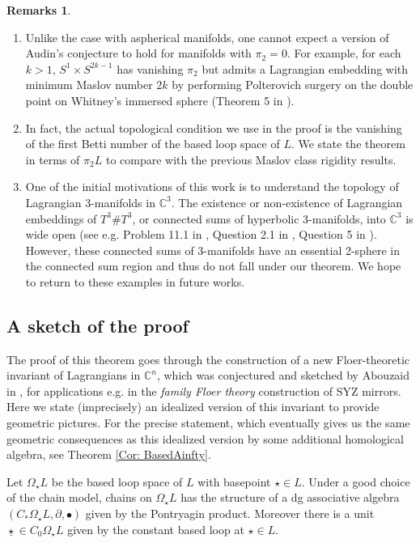\documentclass[10pt]{amsart}
\numberwithin{equation}{section}
\theoremstyle{plain}
\theoremstyle{definition}
\newtheorem{remarks}[theorem]{Remarks}
\theoremstyle{remark}
\numberwithin{equation}{section}
\newcommand{\C}{\mathbb{C}}
\begin{document}
\begin{remarks}
	\begin{enumerate}
		\item 	Unlike the case with aspherical manifolds, one cannot expect a version of Audin's conjecture to hold for manifolds with $\pi_2=0$. For example, for each $k>1$, $S^1\times S^{2k-1}$ has vanishing $\pi_2$ but admits a Lagrangian embedding with minimum Maslov number $2k$ by performing Polterovich surgery on the double point on Whitney's immersed sphere (Theorem 5 in \cite{PolterovichSurgery}).
		\item 	In fact, the actual topological condition we use in the proof is the vanishing of  the first Betti number of the based loop space of $L$.
		We state the theorem in terms of $\pi_2 L$ to compare with the previous Maslov class rigidity results.
		\item One of the initial motivations of this work is to understand the topology of Lagrangian 3-manifolds in $\C^3$. The existence or non-existence of Lagrangian embeddings of $T^3\# T^3$, or connected sums of hyperbolic 3-manifolds, into $\C^3$ is wide open (see e.g. Problem 11.1 in \cite{FukayaLagrangian}, Question 2.1 in \cite{SmithSurvey}, Question 5 in \cite{EvansKedra}). However, these connected sums of 3-manifolds have an essential 2-sphere in the connected sum region and thus do not fall under our theorem. We hope to return to these examples in future works.
	\end{enumerate}
\end{remarks}

\subsection{A sketch of the proof}

The proof of this theorem goes through the construction of a new Floer-theoretic invariant of Lagrangians in $\C^n$, which was conjectured and sketched by Abouzaid in \cite{AbouzaidLect}, for applications e.g. in the \emph{family Floer theory} construction of SYZ mirrors.
Here we state (imprecisely) an idealized version of this invariant to provide geometric pictures. 
For the precise statement, which eventually gives us the same geometric consequences as this idealized version by some additional homological algebra, see Theorem \ref{Cor: BasedAinfty}.


Let $\Omega_\star L$ be the based loop space of $L$ with basepoint $\star\in L$. 
Under a good choice of the chain model, chains on $\Omega_\star L$ has the structure of a dg associative algebra $(C_*\Omega_\star L, \partial, \bullet)$ given by the Pontryagin product. 
Moreover there is a unit $\underline{\star}\in C_0\Omega_\star L$ given by the constant based loop at $\star \in L$.
\end{document}
